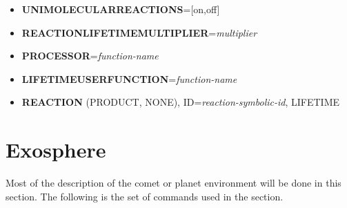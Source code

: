 \begin{itemize}
\item {\bf UNIMOLECULARREACTIONS}=[on,off]

\item {\bf REACTIONLIFETIMEMULTIPLIER}={\it multiplier}

\item {\bf PROCESSOR}={\it function-name}

\item {\bf LIFETIMEUSERFUNCTION}={\it function-name}

\item {\bf REACTION} (PRODUCT, NONE), ID={\it reaction-symbolic-id}, LIFETIME



\end{itemize}



\section{Exosphere}

Most of the description of the comet or planet environment will be done in this section. The following is the set of commands used in the section.

